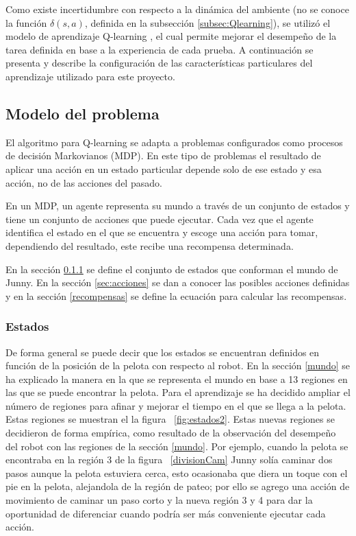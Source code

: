 Como existe incertidumbre con respecto a la dinámica del ambiente (no se conoce la función $\delta(s,a)$, definida en la subsección \ref{subsec:Qlearning}), se utilizó el modelo de aprendizaje Q-learning \cite{Mitchell}, el cual permite mejorar el desempeño de la tarea definida en base a la experiencia de cada prueba. A continuación se presenta y describe la configuración de las caracter\'isticas particulares del aprendizaje utilizado para este proyecto.

\subsection{Modelo del problema}

El algoritmo para Q-learning se adapta a problemas configurados como procesos de decisión Markovianos (MDP). En este tipo de problemas el resultado de aplicar una acción en un estado particular depende solo de ese estado y esa acción, no de las acciones del pasado. 

En un MDP, un agente representa su mundo a través de un conjunto de estados y tiene un conjunto de acciones que puede ejecutar. Cada vez que el agente identifica el estado en el que se encuentra y escoge una acción para tomar, dependiendo del resultado, este recibe una recompensa determinada.

En la sección \ref{estados} se define el conjunto de estados que conforman el mundo de Junny. En la secci\'on \ref{sec:acciones} se dan a conocer las posibles acciones definidas y en la secci\'on \ref{recompensas} se define la ecuaci\'on para calcular las recompensas.   

\subsubsection{Estados}\label{estados}

De forma general se puede decir que los estados se encuentran definidos en función de la posición de la pelota con respecto al robot. En la sección \ref{mundo} se ha explicado la manera en la que se representa el mundo en base a 13 regiones en las que se puede encontrar la pelota. Para el aprendizaje se ha decidido ampliar el número de regiones para afinar y mejorar el tiempo en el que se llega a la pelota. Estas regiones se muestran el la figura ~\ref{fig:estados2}. Estas nuevas regiones se decidieron de forma empírica, como resultado de la observación del desempeño del robot con las regiones de la sección \ref{mundo}. Por ejemplo, cuando la pelota se encontraba en la región 3 de la figura ~\ref{divisionCam} Junny solía caminar dos pasos aunque la pelota estuviera cerca, esto ocasionaba que diera un toque con el pie en la pelota, alejandola de la región de pateo; por ello se agrego una acción de movimiento de caminar un paso corto y la nueva región 3 y 4 para dar la oportunidad de diferenciar cuando podría ser más conveniente ejecutar cada acción.   

